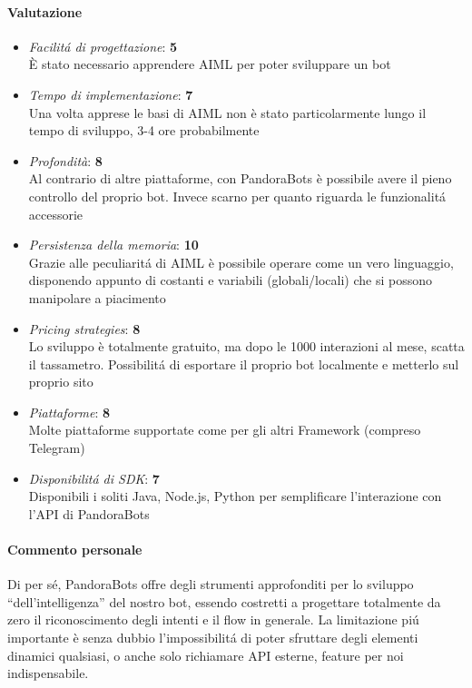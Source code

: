 \documentclass[]{article}
\begin{document}
\paragraph{Valutazione}
\begin{itemize}
\item \textit{Facilitá di progettazione}: \textbf{5} \\ È stato necessario apprendere AIML per poter sviluppare un bot
\item \textit{Tempo di implementazione}: \textbf{7} \\ Una volta apprese le basi di AIML non è stato particolarmente lungo il tempo di sviluppo, 3-4 ore probabilmente
\item \textit{Profondità}: \textbf{8} \\ Al contrario di altre piattaforme, con PandoraBots è possibile avere il pieno controllo del proprio bot. Invece scarno per quanto riguarda le funzionalitá accessorie
\item \textit{Persistenza della memoria}: \textbf{10} \\ Grazie alle peculiaritá di AIML è possibile operare come un vero linguaggio, disponendo appunto di costanti e variabili (globali/locali) che si possono manipolare a piacimento
\item \textit{Pricing strategies}: \textbf{8} \\ Lo sviluppo è totalmente gratuito, ma dopo le 1000 interazioni al mese, scatta il tassametro. Possibilitá di esportare il proprio bot localmente e metterlo sul proprio sito
\item \textit{Piattaforme}: \textbf{8} \\ Molte piattaforme supportate come per gli altri Framework (compreso Telegram)
\item \textit{Disponibilitá di SDK}: \textbf{7} \\ Disponibili i soliti Java, Node.js, Python per semplificare l’interazione con l’API di PandoraBots
\end{itemize}
\paragraph{Commento personale}
Di per sé, PandoraBots offre degli strumenti approfonditi per lo sviluppo “dell'intelligenza” del nostro bot, essendo costretti a progettare totalmente da zero il riconoscimento degli intenti e il flow in generale. La limitazione piú importante è senza dubbio l’impossibilitá di poter sfruttare degli elementi dinamici qualsiasi, o anche solo richiamare API esterne, feature per noi indispensabile.
\end{document}

